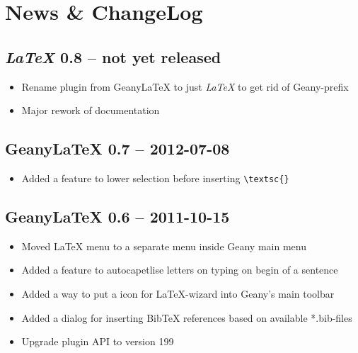\documentclass[%
paper=a4,%
fontsize=11pt,%
twoside=false,%
DIV18,%
headsepline,%
plainheadsepline,%
footsepline,%
plainfootsepline,%
bibliography=totoc,%
listof=totoc,%
BCOR10mm,%
parskip=half,%
openany,%
]{scrartcl}
\begin{document}
\newpage
\section{News \& ChangeLog}

\subsection{\textit{LaTeX} 0.8 -- not yet released}
\begin{itemize}
	\item Rename plugin from Geany\LaTeX{} to just \textit{LaTeX} to get rid of Geany-prefix
	\item Major rework of documentation
\end{itemize}

\subsection{Geany\LaTeX{} 0.7 -- 2012-07-08}
\begin{itemize}
	\item Added a feature to lower selection before inserting
		\texttt{\textbackslash{}textsc\{\}}
\end{itemize}

\subsection{Geany\LaTeX{} 0.6 -- 2011-10-15}
\begin{itemize}
	\item Moved \LaTeX{} menu to a separate menu inside Geany main menu
	\item Added a feature to autocapetlise letters on typing on begin of
		  a sentence
	\item Added a way to put a icon for \LaTeX{}-wizard into Geany's main
		  toolbar
	\item Added a dialog for inserting BibTeX references based on
		  available *.bib-files
	\item Upgrade plugin API to version 199
\end{itemize}
\end{document}
